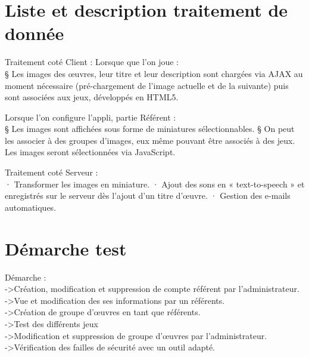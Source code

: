 \documentclass[12pt,a4paper]{report}
\begin{document}
\chapter{Liste et description traitement de donnée}
Traitement coté Client : 
Lorsque que l’on joue :\\
§  Les images des œuvres, leur titre et leur description sont chargées via AJAX au moment nécessaire (pré-chargement de l’image actuelle et de la suivante) puis sont associées aux jeux, développés en HTML5.
 
Lorsque l’on configure l’appli, partie Référent :\\
§  Les images sont affichées sous forme de miniatures sélectionnables.
§  On peut les associer à des groupes d’images, eux même pouvant être associés à des jeux. Les images seront sélectionnées via JavaScript.
 
Traitement coté Serveur :\\
·         Transformer les images en miniature.
·         Ajout des sons en « text-to-speech » et enregistrés sur le serveur dès l’ajout d’un titre d’œuvre.
·         Gestion des e-mails automatiques.

\chapter{Démarche test}
Démarche : \\
->Création, modification et suppression de compte référent par l'administrateur.\\
->Vue et modification des ses informations par un référents.\\
->Création de groupe d'œuvres en tant que référents. \\
->Test des différents jeux\\
->Modification et suppression de groupe d'œuvres par l'administrateur.\\
->Vérification des failles de sécurité avec un outil adapté.
\end{document}
